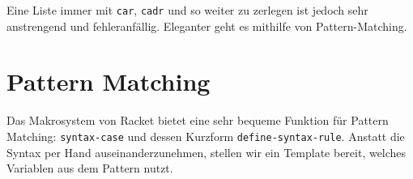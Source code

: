 % 

Eine Liste immer mit \texttt{car}, \texttt{cadr} und so weiter zu zerlegen ist jedoch sehr anstrengend und fehleranfällig. Eleganter geht es mithilfe von Pattern-Matching. %

% 
% 
% 
% 
% 
%   

\section{Pattern Matching}
Das Makrosystem von Racket bietet eine sehr bequeme Funktion für Pattern Matching: \texttt{syntax-case} und dessen Kurzform \texttt{define-syntax-rule}. Anstatt die Syntax per Hand auseinanderzunehmen, stellen wir ein Template bereit, welches Variablen aus dem Pattern nutzt.

